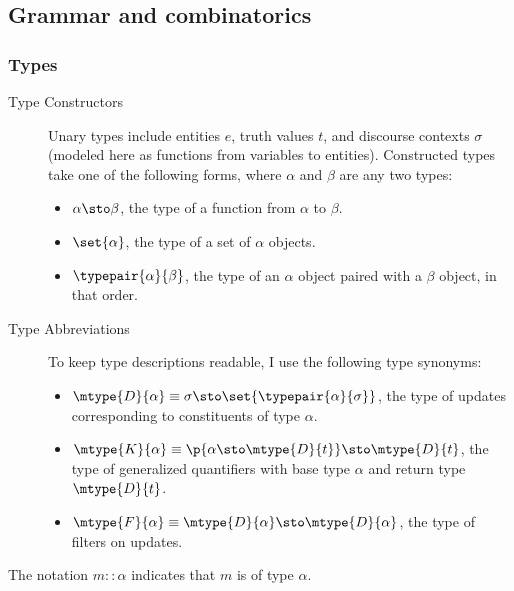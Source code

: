 \documentclass{article}
\begin{document}
\subsection{Grammar and combinatorics}
\label{app:grammar_and_combinatorics}

\subsubsection{Types}
\label{app:types}

\begin{description}
  \item[Type Constructors]
    Unary types include entities $e$, truth values $t$, and discourse contexts
    $\sigma$ (modeled here as functions from variables to entities).
    Constructed types take one of the following forms, where $\alpha$ and
    $\beta$ are any two types:
    \begin{itemize}[topsep=0pt,leftmargin=*]
      \item $\alpha \sto \beta$, the type of a function from $\alpha$ to $\beta$.
      \item $\set{\alpha}$, the type of a set of $\alpha$ objects.
      \item $\typepair{\alpha}{\beta}$, the type of an $\alpha$ object paired with
        a $\beta$ object, in that order.
    \end{itemize}
  \item[Type Abbreviations]
    To keep type descriptions readable, I use the following type synonyms:
    \begin{itemize}[topsep=0pt,leftmargin=*]
      \item
        $\mtype{D}{\alpha} \equiv \sigma\sto \set{\typepair{\alpha}{\sigma}}$,
        the type of updates corresponding to constituents of type $\alpha$.
      \item
        $\mtype{K}{\alpha} \equiv \p{\alpha\sto \mtype{D}{t}}\sto
        \mtype{D}{t}$, the type of generalized quantifiers with base type
        $\alpha$ and return type $\mtype{D}{t}$.
      \item
        $\mtype{F}{\alpha} \equiv \mtype{D}{\alpha}\sto \mtype{D}{\alpha}$,
        the type of filters on updates.
    \end{itemize}
\end{description}

\noindent
The notation $m :: \alpha$ indicates that $m$ is of type $\alpha$.
\end{document}
